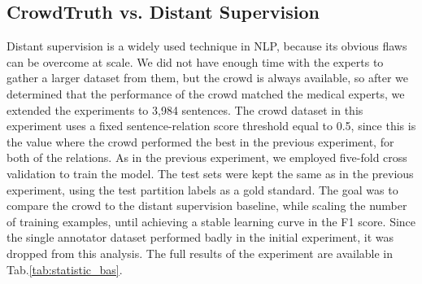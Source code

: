 \subsection{CrowdTruth vs. Distant Supervision}
\label{sec:res_ds}

Distant supervision is a widely used technique in NLP, because its obvious flaws can be overcome at scale.  We did not have enough time with the experts to gather a larger dataset from them, but the crowd is always available, so after we determined that the performance of the crowd matched the medical experts, we extended the experiments to 3,984 sentences. The crowd dataset in this experiment uses a fixed sentence-relation score threshold equal to 0.5, since this is the value where the crowd performed the best in the previous experiment, for both of the relations. As in the previous experiment, we employed five-fold cross validation to train the model. The test sets were kept the same as in the previous experiment, using the test partition labels as a gold standard. The goal was to compare the crowd to the distant supervision baseline, while scaling the number of training examples, until achieving a stable learning curve in the F1 score. Since the single annotator dataset performed badly in the initial experiment, it was dropped from this analysis. The full results of the experiment are available in Tab.\ref{tab:statistic_bas}.

